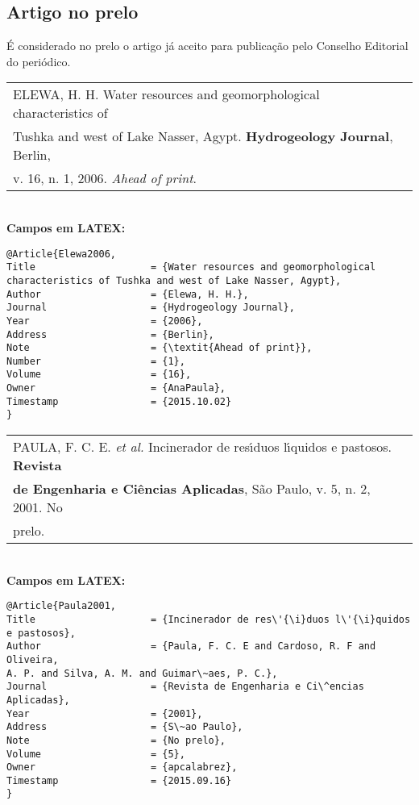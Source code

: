 \subsection{Artigo no prelo}

\'E considerado no prelo o artigo j\'a aceito para publica\c{c}\~ao pelo Conselho
Editorial do peri\'odico.

\begin{tabular}{|l|c|} \hline
	ELEWA, H. H. Water resources and geomorphological characteristics of
	\\Tushka and west of Lake Nasser, Agypt. \textbf{Hydrogeology Journal}, Berlin,
	\\v. 16, n. 1, 2006. \textit{Ahead of print}. \\\hline
\end{tabular} \\

\textbf{Campos em LATEX:} 

\begin{verbatim}
@Article{Elewa2006,
Title                    = {Water resources and geomorphological 
characteristics of Tushka and west of Lake Nasser, Agypt},
Author                   = {Elewa, H. H.},
Journal                  = {Hydrogeology Journal},
Year                     = {2006},
Address                  = {Berlin},
Note                     = {\textit{Ahead of print}},
Number                   = {1},
Volume                   = {16},
Owner                    = {AnaPaula},
Timestamp                = {2015.10.02}
}
\end{verbatim}

\begin{tabular}{|l|c|} \hline
	PAULA, F. C. E. \textit{et al.} Incinerador de res\'{\i}duos l\'{\i}quidos e pastosos.
	\textbf{Revista } \\ \textbf{de Engenharia e Ci\^encias Aplicadas}, S\~ao Paulo, v. 5, n. 2,
	2001. No \\prelo. \\\hline
\end{tabular} \\

\textbf{Campos em LATEX:} 

\begin{verbatim}
@Article{Paula2001,
Title                    = {Incinerador de res\'{\i}duos l\'{\i}quidos e pastosos},
Author                   = {Paula, F. C. E and Cardoso, R. F and Oliveira, 
A. P. and Silva, A. M. and Guimar\~aes, P. C.},
Journal                  = {Revista de Engenharia e Ci\^encias Aplicadas},
Year                     = {2001},
Address                  = {S\~ao Paulo},
Note                     = {No prelo},
Volume                   = {5},
Owner                    = {apcalabrez},
Timestamp                = {2015.09.16}
}
\end{verbatim}

